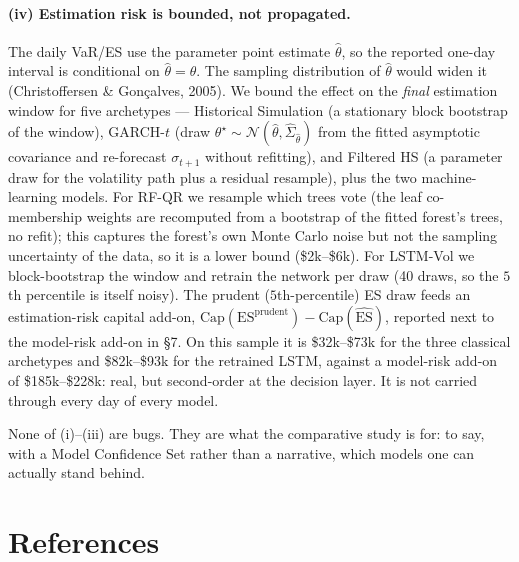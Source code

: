 \documentclass[11pt,a4paper]{article}
\begin{document}
\paragraph{(iv) Estimation risk is bounded, not propagated.} The daily VaR/ES
use the parameter point estimate $\hat\theta$, so the reported one-day interval
is conditional on $\hat\theta=\theta$. The sampling distribution of $\hat\theta$
would widen it (Christoffersen \& Gon\c{c}alves, 2005). We bound the effect on
the \emph{final} estimation window for five archetypes --- Historical
Simulation (a stationary block bootstrap of the window), GARCH-$t$ (draw
$\theta^\star\sim\mathcal{N}(\hat\theta,\widehat{\Sigma}_{\hat\theta})$ from the fitted
asymptotic covariance and re-forecast $\sigma_{t+1}$ without refitting), and
Filtered HS (a parameter draw for the volatility path plus a residual
resample), plus the two machine-learning models. For RF-QR we resample which
trees vote (the leaf co-membership weights are recomputed from a bootstrap of
the fitted forest's trees, no refit); this captures the forest's own Monte Carlo
noise but not the sampling uncertainty of the data, so it is a lower bound
(\$2k--\$6k). For LSTM-Vol we block-bootstrap the window and retrain the network
per draw (40 draws, so the $5$th percentile is itself noisy). The prudent
($5$th-percentile) ES draw feeds an
estimation-risk capital add-on, $\mathrm{Cap}(\mathrm{ES}^{\mathrm{prudent}})
-\mathrm{Cap}(\widehat{\mathrm{ES}})$, reported next to the model-risk add-on in
\S7. On this sample it is \$32k--\$73k for the three classical archetypes and
\$82k--\$93k for the retrained LSTM, against a model-risk add-on of
\$185k--\$228k: real, but second-order at the decision layer. It is not
carried through every day of every model.

None of (i)--(iii) are bugs. They are what the comparative study is for: to say,
with a Model Confidence Set rather than a narrative, which models one can
actually stand behind.

\section*{References}
\end{document}
